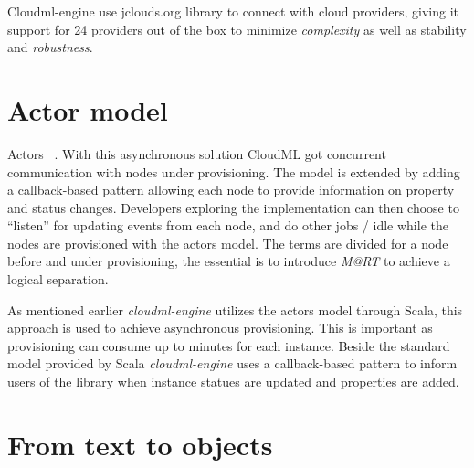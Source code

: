 \hr

Cloudml-engine use jclouds.org library to connect with cloud providers, giving it support
for 24 providers out of the box to minimize \emph{complexity} as well as stability and \emph{robustness}.

\section{Actor model}

Actors ~\cite{actors:haller07}.
With this asynchronous solution CloudML got concurrent communication with nodes under provisioning.
The model is extended by adding a callback-based pattern allowing each node to provide 
information on property and status changes.
Developers exploring the implementation can then choose to ``listen'' for updating events from each node,
and do other jobs / idle while the nodes are provisioned with the actors model.
The terms are divided for a node before and under provisioning, the essential is to introduce 
\emph{M@RT} to achieve a logical separation.

\hr

As mentioned earlier \emph{cloudml-engine} utilizes the actors model through Scala,
this approach is used to achieve asynchronous provisioning.
This is important as provisioning can consume up to minutes for each instance.
Beside the standard model provided by Scala \emph{cloudml-engine} uses
a callback-based pattern to inform users of the library when instance statues
are updated and properties are added.

\section{From text to objects}


